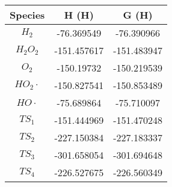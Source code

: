 \begin{tabular}{|c|c|c|}
       \hline
       \textbf{Species} & \textbf{H (H)}  & \textbf{G (H)}  \\ \hline
       $H_2$            & -76.369549  & -76.390966  \\ \hline
       $H_2O_2$             & -151.457617 & -151.483947 \\ \hline
       $O_2$               & -150.19732  & -150.219539 \\ \hline
       $HO_2\cdot$              & -150.827541 & -150.853489 \\ \hline
       $HO\cdot$               & -75.689864  & -75.710097  \\ \hline
       $TS_1$              & -151.444969 & -151.470248 \\ \hline
       $TS_2$              & -227.150384 & -227.183337 \\ \hline
       $TS_3$              & -301.658054 & -301.694648 \\ \hline
       $TS_4$              & -226.527675 & -226.560349 \\ \hline
\end{tabular}

